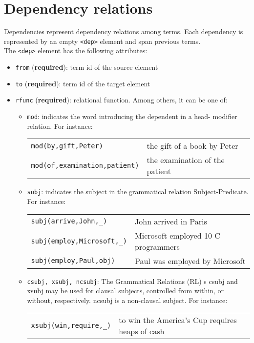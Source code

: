 
\section{Dependency relations}
\label{sec:dependency-relations}

Dependencies represent dependency relations among terms. Each dependency is
represented by an empty \texttt{<dep>} element and span previous terms.\\

The \texttt{<dep>} element has the following attributes:
\begin{itemize}
\item \texttt{from} (\textbf{required}): term id of the source element
\item \texttt{to} (\textbf{required}): term id of the target element
\item \texttt{rfunc} (\textbf{required}): relational function. Among others,
  it can be one of:
  \begin{itemize}
  \item \texttt{mod}: indicates the word introducing the dependent in a
    head- modifier relation.  For instance:

    \begin{tabular}{ll}
      \texttt{mod(by,gift,Peter)} & the gift of a book by Peter\\
      \texttt{mod(of,examination,patient)} & the examination of the patient
    \end{tabular}

  \item \texttt{subj}: indicates the subject in the grammatical relation
    Subject-Predicate. For instance:

    \begin{tabular}{ll}
      \texttt{subj(arrive,John,\_)} & John arrived in Paris\\
      \texttt{subj(employ,Microsoft,\_)} &  Microsoft employed 10 C programmers\\
      \texttt{subj(employ,Paul,obj)} & Paul was employed by Microsoft
    \end{tabular}

  \item \texttt{csubj, xsubj, ncsubj}: The Grammatical Relations (RL) s
    csubj and xsubj may be used for clausal subjects, controlled from
    within, or without, respectively. ncsubj is a non-clausal subject. For
    instance:

    \begin{tabular}{ll}
      \texttt{xsubj(win,require,\_)} &  to win the America's Cup requires heaps of cash
    \end{tabular}


\end{itemize}
\end{itemize}
